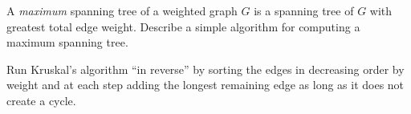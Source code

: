\begin{prob}
    A \emph{maximum} spanning tree of a weighted graph $G$ is a spanning tree
    of $G$ with greatest total edge weight.
    Describe a simple algorithm for computing a maximum spanning tree.

    \begin{soln}
        Run Kruskal's algorithm ``in reverse'' by sorting the edges in
        decreasing order by weight and at each step adding the longest
        remaining edge as long as it does not create a cycle.
    \end{soln}
\end{prob}
